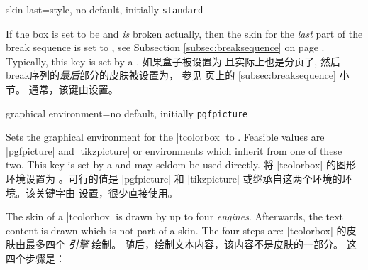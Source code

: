 \begin{docTcbKey}{skin last}{=}{style, no default, initially \texttt{standard}}
\begin{stripedbox}
If the box is set to be  and \emph{is} broken actually,
then the skin for the \emph{last} part of the break sequence
is set to , see Subsection \ref{subsec:breaksequence} on page \pageref{subsec:breaksequence}.
Typically, this key is set by a .
\tcblower
如果盒子被设置为 且实际上也是分页了,%
然后break序列的\emph{最后}部分的皮肤被设置为，
参见 \pageref{subsec:breaksequence} 页上的 \ref{subsec:breaksequence} 小节。
通常，该键由设置。
\end{stripedbox}
\end{docTcbKey}

\begin{docTcbKey}{graphical environment}{=}{no default, initially \texttt{pgfpicture}}
\begin{stripedbox}
Sets the graphical environment for the |tcolorbox| to .
Feasible values are |pgfpicture| and |tikzpicture| or environments which inherit from one of these two. 
This key is set by a  and may seldom be used directly.
\tcblower
将 |tcolorbox| 的图形环境设置为 。可行的值是 |pgfpicture| 和 |tikzpicture| 或继承自这两个环境的环境。该关键字由  设置，很少直接使用。
\end{stripedbox}
\end{docTcbKey}

\begin{stripedbox}
The skin of a |tcolorbox| is drawn by up to four \emph{engines}.
Afterwards, the text content is drawn which is not part of a skin.
The four steps are:
\tcblower
|tcolorbox| 的皮肤由最多四个 \emph{引擎} 绘制。 随后，绘制文本内容，该内容不是皮肤的一部分。 这四个步骤是：
\end{stripedbox}

